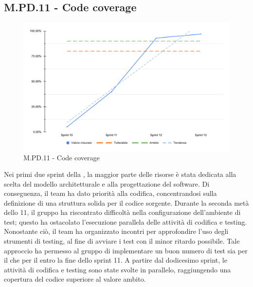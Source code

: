 \subsection{M.PD.11 - Code coverage}

\begin{figure}[H]
  \centering
  \includegraphics[width=\textwidth]{assets/code_coverage.pdf}
  \caption{M.PD.11 - Code coverage}
\end{figure}

\par Nei primi due sprint della , la maggior parte delle risorse è stata dedicata alla scelta del modello architetturale e alla progettazione del software. Di conseguenza, il team ha dato priorità alla codifica, concentrandosi sulla definizione di una struttura solida per il codice sorgente. Durante la seconda metà dello  11, il gruppo ha riscontrato difficoltà nella configurazione dell'ambiente di test; questo ha ostacolato l'esecuzione parallela delle attività di codifica e testing. Nonostante ciò, il team ha organizzato incontri per approfondire l'uso degli strumenti di testing, al fine di avviare i test con il minor ritardo possibile. Tale approccio ha permesso al gruppo di implementare un buon numero di test sia per il  che per il  entro la fine dello sprint 11. A partire dal dodicesimo sprint, le attività di codifica e testing sono state svolte in parallelo, raggiungendo una copertura del codice superiore al valore ambito.